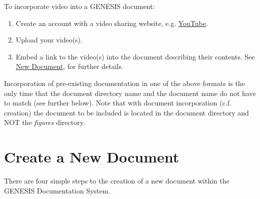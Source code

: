 \documentclass[12pt]{article}
\begin{document}
To incorporate video into a GENESIS document: 

\begin{enumerate}
   \item Create an account with a video sharing website, e.g. \href{http://www.youtube.com/create_account}{YouTube}.
   \item Upload your video(s).
   \item Embed a link to the video(s) into the document describing their contents. See \href{../NewDocument/NewDocument.tex}{New Document}, for further details.
\end{enumerate}

Incorporation of pre-existing documentation in one of the above formats is the only time that the document directory name and the document name do not have to match (see further below). Note that with document incorporation (c.f. creation) the document to be included is located in the document directory and NOT the {\it figures} directory.
 
\section*{Create a New Document}

There are four simple steps to the creation of a new document within the GENESIS Documentation System.
\end{document}
